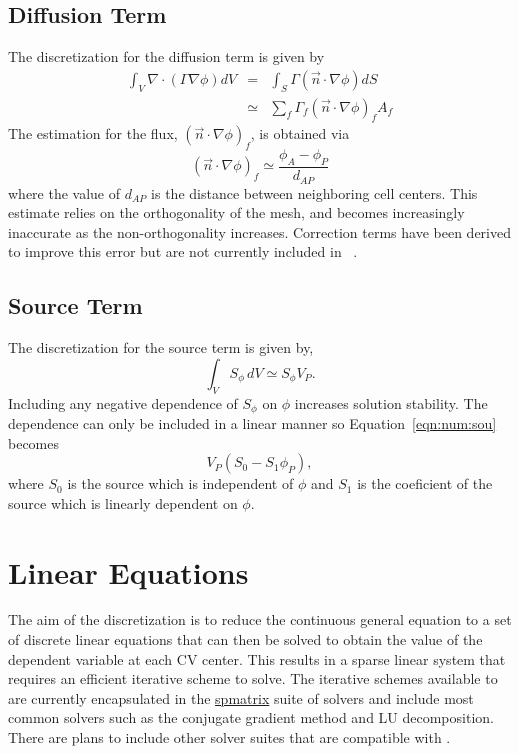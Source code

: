 \subsection{Diffusion Term}

The discretization for the diffusion term is given by
\begin{eqnarray}
\int_V \nabla \cdot (\Gamma\nabla\phi) dV & = & \int_S \Gamma (\vec{n} \cdot \nabla\phi) dS \\
& \simeq & \sum_f \Gamma_f (\vec{n} \cdot \nabla\phi)_f A_f
\label{eqn:num:dif}
\end{eqnarray}
The estimation for the flux, $(\vec{n} \cdot \nabla\phi)_f$, is
obtained via
\begin{equation}
(\vec{n} \cdot \nabla\phi)_f \simeq \frac{\phi_A-\phi_P}{d_{AP}}
\end{equation}
where the value of $d_{AP}$ is the distance between neighboring cell
centers.  This estimate relies on the orthogonality of the mesh, and
becomes increasingly inaccurate as the non-orthogonality increases.
Correction terms have been derived to improve this error but are not
currently included in \FiPy{}~\cite{croftphd}.

\subsection{Source Term}

The discretization for the source term is given by, 
\begin{equation}
\int_V S_{\phi}\,dV \simeq S_\phi V_P.
\label{eqn:num:sou}
\end{equation}
Including any negative dependence of $S_\phi$ on $\phi$ increases
solution stability. The dependence can only be included in a linear
manner so Equation~\eqref{eqn:num:sou} becomes
\begin{equation}
V_P (S_0 - S_1 \phi_P),
\end{equation}
where \( S_0 \) is the source which is independent of \( \phi \) and
\( S_1 \) is the coeficient of the source which is linearly dependent
on \( \phi \).

\section{Linear Equations}

The aim of the discretization is to reduce the continuous general
equation to a set of discrete linear equations that can then be solved
to obtain the value of the dependent variable at each CV center. This
results in a sparse linear system that requires an efficient iterative
scheme to solve. The iterative schemes available to \FiPy{} are
currently encapsulated in the \href{#id5}{spmatrix} suite of solvers
and include most common solvers such as the conjugate gradient method
and LU decomposition. There are plans to include other solver suites
that are compatible with \Python{}.

